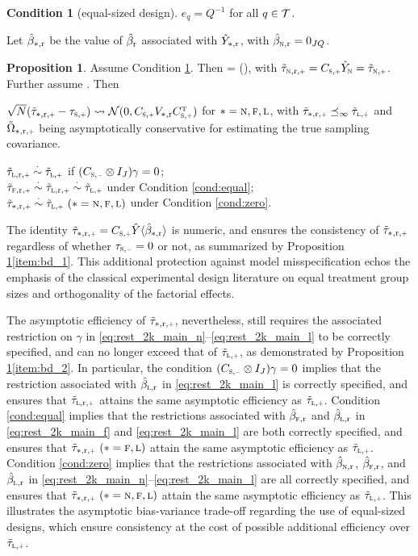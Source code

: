 \documentclass[11pt]{article}
\theoremstyle{definition}
\newtheorem{proposition}{Proposition}
\newtheorem{condition}{Condition}
\begin{document}
\begin{condition}
[equal-sized design]\label{condition::equal-group-size}
$e_q = Q^{-1}$ for all $q \in \mathcal{T}$. 
\end{condition}


Let $\hat\beta_{*, \textup{r}}$ be the value of $\hat\beta_{\textup{r}}$ associated with $\hat Y_{*,\textup{r}}$, with  $\hat\beta_{\textsc{n}, \textup{r}} = 0_{JQ}$. 


\begin{proposition}\label{prop:bd}
Assume Condition \ref{condition::equal-group-size}. 
Then
\begina
\ttsrp     = \csp \hy\la\hbsr\ra \qquad (\nfl),
\enda
with $\ttnrp =  \csp \hyn = \ttnp$.
Further assume \creasym. Then
\begine[(i)]
\item\label{item:bd_1} $\sqrt N(\ttsrp - \tsp ) \rs \mn(0, \csp \vsr \csp^\T)$ for $* =\textsc{n}, \textsc{f}, \textsc{l}$, with $\ttsrp \preci \ttlp$ and $\tosrp$ being asymptotically conservative for estimating the true sampling covariance.
%
\item\label{item:bd_2}
$\ttlrp \asim \ttlp$ if $(\csm  \otimes I_J) \gamma = 0$;\\
 $\ttfrp\asim \ttlrp \asim \ttlp$ under Condition \ref{cond:equal}; \\
 $\ttsrp \asim \ttlp \ (\nfl)$ under Condition \ref{cond:zero}. 
\ende
\end{proposition}

\medskip

The identity $
\ttsrp     = \csp \hybsr $ is numeric, and ensures the consistency of $\ttsrp$ regardless of whether $\tsm = 0$ or not, as summarized by Proposition \ref{prop:bd}\eqref{item:bd_1}.
This additional protection against model misspecification echos the emphasis of the classical experimental design literature on equal treatment group sizes and orthogonality of the factorial effects. 

The asymptotic efficiency of $\ttsrp$, nevertheless, still requires the associated restriction on $\gamma$ in \eqref{eq:rest_2k_main_n}--\eqref{eq:rest_2k_main_l} to be correctly specified, and can no longer exceed that of $\ttlp$, as demonstrated by Proposition \ref{prop:bd}\eqref{item:bd_2}. 
In particular, the condition $(\csm \otimes I_J)\gamma = 0$ implies that the restriction associated with $\hat\beta_{\textsc{l}, \textup{r}}$  in \eqref{eq:rest_2k_main_l} is correctly specified, and ensures that $\ttlrp$ attains the same asymptotic efficiency as $\ttlp$.  Condition \ref{cond:equal} implies that the restrictions associated with $\hat\beta_{\textsc{f}, \textup{r}}$ and $\hat\beta_{\textsc{l}, \textup{r}}$  in \eqref{eq:rest_2k_main_f} and \eqref{eq:rest_2k_main_l} are both correctly specified, and ensures that $\ttsrp \ (\fl)$ attain the same asymptotic efficiency as $\ttlp$.
Condition \ref{cond:zero} implies that the restrictions associated with $\hat\beta_{\textsc{n}, \textup{r}}$, $\hat\beta_{\textsc{f}, \textup{r}}$, and $\hat\beta_{\textsc{l}, \textup{r}}$ in \eqref{eq:rest_2k_main_n}--\eqref{eq:rest_2k_main_l} are all correctly specified, and ensures that $\ttsrp \ (\nfl)$ attain the same asymptotic efficiency as $\ttlp$.
This illustrates the asymptotic bias-variance trade-off regarding the use of equal-sized designs, which ensure consistency at the cost of possible additional efficiency over $\ttlp$.
\end{document}
